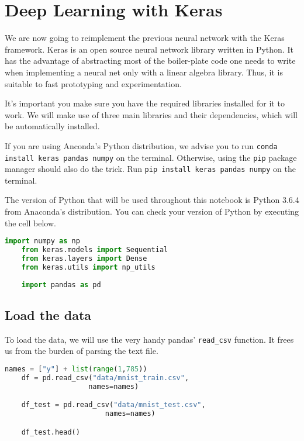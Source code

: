 \section{Deep Learning with Keras}

We are now going to reimplement the previous neural network with the Keras framework. Keras is an open source neural network library written in Python. It has the advantage of abstracting most of the boiler-plate code one needs to write when implementing a neural net only with a linear algebra library. Thus, it is suitable to fast prototyping and experimentation.

It's important you make sure you have the required libraries installed for it to work. We will make use of three main libraries and their dependencies, which will be automatically installed.

If you are using Anconda's Python distribution, we advise you to run \lstinline{conda install keras pandas numpy} on the terminal. 
Otherwise, using the \lstinline{pip} package manager should also do the trick.
Run \lstinline{pip install keras pandas numpy} on the terminal.

The version of Python that will be used throughout this notebook is Python 3.6.4 from Anaconda's distribution. You can check your version of Python by executing the cell below.

\begin{lstlisting}[language=Python]
    import numpy as np
    from keras.models import Sequential
    from keras.layers import Dense
    from keras.utils import np_utils
    
    import pandas as pd
\end{lstlisting}

\subsection{Load the data}

To load the data, we will use the very handy pandas' \lstinline{read_csv} function. It frees us from the burden of parsing the text file.

\begin{lstlisting}[language=Python]
    names = ["y"] + list(range(1,785))
    df = pd.read_csv("data/mnist_train.csv", 
                    names=names)

    df_test = pd.read_csv("data/mnist_test.csv", 
                        names=names)

    df_test.head()
\end{lstlisting}

